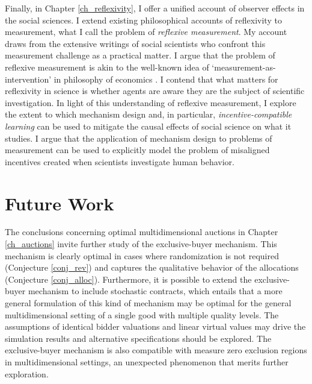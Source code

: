 Finally, in Chapter \ref{ch_reflexivity}, I offer a unified account of observer effects in the social sciences. I extend existing philosophical accounts of reflexivity to measurement, what I call the problem of \textit{reflexive measurement}. My account draws from the extensive writings of social scientists who confront this measurement challenge as a practical matter. I argue that the problem of reflexive measurement is akin to the well-known idea of `measurement-as-intervention' in philosophy of economics \autocite{morgan2001}. I contend that what matters for reflexivity in science is whether agents are aware they are the subject of scientific investigation. In light of this understanding of reflexive measurement, I explore the extent to which mechanism design and, in particular, \textit{incentive-compatible learning} can be used to mitigate the causal effects of social science on what it studies. I argue that the application of mechanism design to problems of measurement can be used to explicitly model the problem of misaligned incentives created when scientists investigate human behavior.








\section{Future Work}

The conclusions concerning optimal multidimensional auctions in Chapter \ref{ch_auctions} invite further study of the exclusive-buyer mechanism. This mechanism is clearly optimal in cases where randomization is not required (Conjecture \ref{conj_rev}) and captures the qualitative behavior of the allocations (Conjecture \ref{conj_alloc}). Furthermore, it is possible to extend the exclusive-buyer mechanism to include stochastic contracts, which entails that a more general formulation of this kind of mechanism may be optimal for the general multidimensional setting of a single good with multiple quality levels. The assumptions of identical bidder valuations and linear virtual values may drive the simulation results and alternative specifications should be explored. The exclusive-buyer mechanism is also compatible with measure zero exclusion regions in multidimensional settings, an unexpected phenomenon that merits further exploration.

